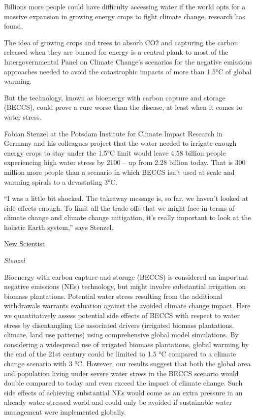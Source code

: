 \documentclass[
]{book}
\begin{document}
Billions more people could have difficulty accessing water if the world opts for a massive expansion in growing energy crops to fight climate change, research has found.

The idea of growing crops and trees to absorb CO2 and capturing the carbon released when they are burned for energy is a central plank to most of the Intergovernmental Panel on Climate Change's scenarios for the negative emissions approaches needed to avoid the catastrophic impacts of more than 1.5°C of global warming.

But the technology, known as bioenergy with carbon capture and storage (BECCS), could prove a cure worse than the disease, at least when it comes to water stress.

Fabian Stenzel at the Potsdam Institute for Climate Impact Research in Germany and his colleagues project that the water needed to irrigate enough energy crops to stay under the 1.5°C limit would leave 4.58 billion people experiencing high water stress by 2100 -- up from 2.28 billion today. That is 300 million more people than a scenario in which BECCS isn't used at scale and warming spirals to a devastating 3°C.

``I was a little bit shocked. The takeaway message is, so far, we haven't looked at side effects enough. To limit all the trade-offs that we might face in terms of climate change and climate change mitigation, it's really important to look at the holistic Earth system,'' says Stenzel.

\href{https://www.newscientist.com/article/2270227-carbon-negative-crops-may-mean-water-shortages-for-4-5-billion-people/\#ixzz6q2AZOybe}{New Scientist}

\emph{Stenzel}

Bioenergy with carbon capture and storage (BECCS) is considered an important negative
emissions (NEs) technology, but might involve substantial irrigation on biomass plantations.
Potential water stress resulting from the additional withdrawals warrants evaluation against
the avoided climate change impact. Here we quantitatively assess potential side effects of
BECCS with respect to water stress by disentangling the associated drivers (irrigated biomass
plantations, climate, land use patterns) using comprehensive global model simulations.
By considering a widespread use of irrigated biomass plantations, global warming by the
end of the 21st century could be limited to 1.5 °C compared to a climate change scenario with
3 °C. However, our results suggest that both the global area and population living under
severe water stress in the BECCS scenario would double compared to today and even exceed
the impact of climate change. Such side effects of achieving substantial NEs would come as
an extra pressure in an already water-stressed world and could only be avoided if sustainable
water management were implemented globally.
\end{document}
